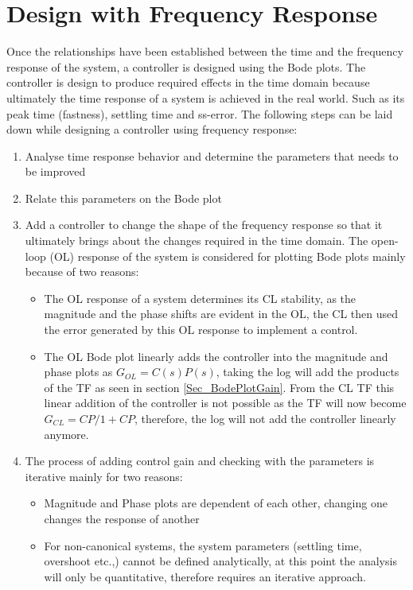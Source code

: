 \section{Design with Frequency Response}

Once the relationships have been established between the time and the frequency response of the system, a controller is designed using the Bode plots. The controller is design to produce required effects in the time domain because ultimately the time response of a system is achieved in the real world. Such as its peak time (fastness), settling time and ss-error. The following steps can be laid down while designing a controller using frequency response:
\begin{enumerate}
	\item Analyse time response behavior and determine the parameters that needs to be improved
	\item Relate this parameters on the Bode plot
	\item Add a controller to change the shape of the frequency response so that it ultimately brings about the changes required in the time domain. The open-loop (OL) response of the system is considered for plotting Bode plots mainly because of two reasons:
	\begin{itemize}
		\item The OL response of a system determines its CL stability, as the magnitude and the phase shifts are evident in the OL, the CL then used the error generated by this OL response to implement a control.
		\item The OL Bode plot linearly adds the controller into the magnitude and phase plots as $G_{OL} = C(s)P(s)$, taking the log will add the products of the TF as seen in section \ref{Sec_BodePlotGain}. From the CL TF this linear addition of the controller is not possible as the TF will now become $G_{CL} = CP / 1 + CP$, therefore, the log will not add the controller linearly anymore.
	\end{itemize}
	\item The process of adding control gain and checking with the parameters is iterative mainly for two reasons:
	\begin{itemize}
		\item Magnitude and Phase plots are dependent of each other, changing one changes the response of another
		\item For non-canonical systems, the system parameters (settling time, overshoot etc.,) cannot be defined analytically, at this point the analysis will only be quantitative, therefore requires an iterative approach.
	\end{itemize}
\end{enumerate}

